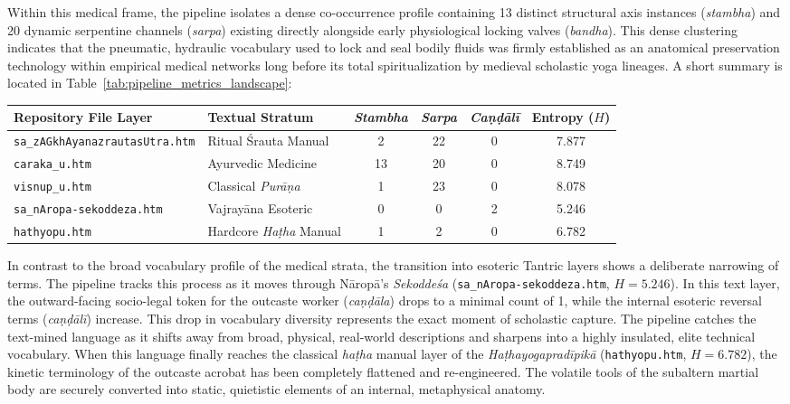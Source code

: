 \documentclass[11pt,twoside,letterpaper]{article}
\begin{document}
Within this medical frame, the pipeline isolates a dense co-occurrence profile containing 13 distinct structural axis instances (\textit{stambha}) and 20 dynamic serpentine channels (\textit{sarpa}) existing directly alongside early physiological locking valves (\textit{bandha}). This dense clustering indicates that the pneumatic, hydraulic vocabulary used to lock and seal bodily fluids was firmly established as an anatomical preservation technology within empirical medical networks long before its total spiritualization by medieval scholastic yoga lineages. A short summary is located in Table~\ref{tab:pipeline_metrics_landscape}:

\vspace{0.3cm}
\begin{center}
\small\sffamily
\begin{tabular}{ll ccc c}
\hline
\textbf{Repository File Layer} & \textbf{Textual Stratum} & \textit{Stambha} & \textit{Sarpa} & \textit{Caṇḍālī} & \textbf{Entropy ($H$)} \\ \hline
\texttt{sa\_zAGkhAyanazrautasUtra.htm} & Ritual Śrauta Manual & 2 & 22 & 0 & 7.877 \\
\texttt{caraka\_u.htm} & Ayurvedic Medicine & 13 & 20 & 0 & 8.749 \\
\texttt{visnup\_u.htm} & Classical \textit{Purāṇa} & 1 & 23 & 0 & 8.078 \\
\texttt{sa\_nAropa-sekoddeza.htm} & Vajrayāna Esoteric & 0 & 0 & 2 & 5.246 \\
\texttt{hathyopu.htm} & Hardcore \textit{Haṭha} Manual & 1 & 2 & 0 & 6.782 \\ \hline
\end{tabular}
\label{tab:pipeline_metrics_landscape}
\end{center}
\vspace{0.3cm}

In contrast to the broad vocabulary profile of the medical strata, the transition into esoteric Tantric layers shows a deliberate narrowing of terms. The pipeline tracks this process as it moves through Nāropā's \textit{Sekoddeśa} (\texttt{sa\_nAropa-sekoddeza.htm}, $H = 5.246$). In this text layer, the outward-facing socio-legal token for the outcaste worker (\textit{caṇḍāla}) drops to a minimal count of 1, while the internal esoteric reversal terms (\textit{caṇḍālī}) increase. This drop in vocabulary diversity represents the exact moment of scholastic capture. The pipeline catches the text-mined language as it shifts away from broad, physical, real-world descriptions and sharpens into a highly insulated, elite technical vocabulary. When this language finally reaches the classical \textit{haṭha} manual layer of the \textit{Haṭhayogapradīpikā} (\texttt{hathyopu.htm}, $H = 6.782$), the kinetic terminology of the outcaste acrobat has been completely flattened and re-engineered. The volatile tools of the subaltern martial body are securely converted into static, quietistic elements of an internal, metaphysical anatomy. 
\end{document}
